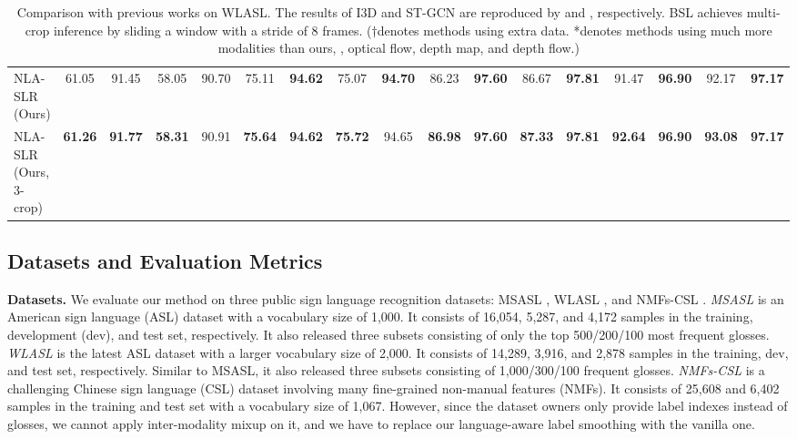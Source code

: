 \documentclass[10pt,twocolumn,letterpaper]{article}
\def \tbf{\textbf}
\begin{document}
\begin{table*}[t]
{\begin{tabular}{l|cc|cc|cc|cc|cc|cc|cc|cc}
NLA-SLR (Ours) & 61.05 & 91.45 & 58.05 & 90.70 & 75.11 & \tbf{94.62} & 75.07 & \tbf{94.70} & 86.23 & \tbf{97.60} & 86.67 & \tbf{97.81} & 91.47 & \tbf{96.90} & 92.17 & \tbf{97.17} \\
NLA-SLR (Ours, 3-crop) & \tbf{61.26} & \tbf{91.77} & \tbf{58.31} & 90.91 & \tbf{75.64} & \tbf{94.62} & \tbf{75.72} & 94.65 & \tbf{86.98} & \tbf{97.60} & \tbf{87.33} & \tbf{97.81} & \tbf{92.64} & \tbf{96.90} & \tbf{93.08} & \tbf{97.17} \\

\bottomrule
\end{tabular}}
\vspace{-3mm}
\caption{Comparison with previous works on WLASL. The results of I3D and ST-GCN are reproduced by \cite{li2020word} and \cite{hu2021signbert}, respectively. BSL achieves multi-crop inference by sliding a window with a stride of 8 frames. ($\dagger$denotes methods using extra data. *denotes methods using much more modalities than ours, \eg, optical flow, depth map, and depth flow.)}
\label{tab:sota_wlasl}
\vspace{-5mm}
\end{table*}


\subsection{Datasets and Evaluation Metrics}
\noindent\textbf{Datasets.}
We evaluate our method on three public sign language recognition datasets: MSASL \cite{joze2019ms}, WLASL \cite{li2020word}, and NMFs-CSL \cite{hu2021global}.
\textit{MSASL} is an American sign language (ASL) dataset with a vocabulary size of 1,000. It consists of 16,054, 5,287, and 4,172 samples in the training, development (dev), and test set, respectively. It also released three subsets consisting of only the top 500/200/100 most frequent glosses.
\textit{WLASL} is the latest ASL dataset with a larger vocabulary size of 2,000. It consists of 14,289, 3,916, and 2,878 samples in the training, dev, and test set, respectively. Similar to MSASL, it also released three subsets consisting of 1,000/300/100 frequent glosses.
\textit{NMFs-CSL} is a challenging Chinese sign language (CSL) dataset involving many fine-grained non-manual features (NMFs). It consists of 25,608 and 6,402 samples in the training and test set with a vocabulary size of 1,067. However, since the dataset owners only provide label indexes instead of glosses, we cannot apply inter-modality mixup on it, and we have to replace our language-aware label smoothing with the vanilla one.
\end{document}
